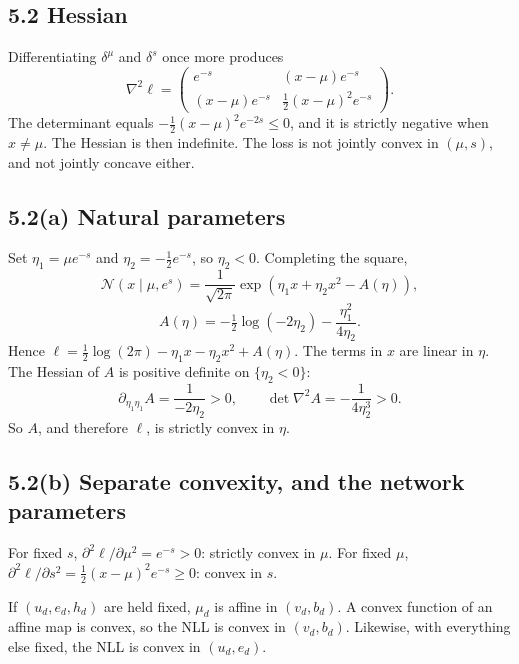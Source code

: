\documentclass[11pt]{article}
\theoremstyle{remark}
\newcommand{\N}{\mathcal{N}}
\begin{document}
\subsection*{5.2 Hessian}

Differentiating \(\delta^\mu\) and \(\delta^s\) once more produces
\[
\nabla^2\ell
=\begin{pmatrix}
e^{-s} & (x-\mu)e^{-s}\\
(x-\mu)e^{-s} & \tfrac12(x-\mu)^2 e^{-s}
\end{pmatrix}.
\]
The determinant equals \(-\tfrac12(x-\mu)^2 e^{-2s}\le 0\), and it is strictly negative when \(x\ne\mu\). The Hessian is then indefinite. The loss is not jointly convex in \((\mu,s)\), and not jointly concave either.

\subsection*{5.2(a) Natural parameters}

Set \(\eta_1=\mu e^{-s}\) and \(\eta_2=-\tfrac12 e^{-s}\), so \(\eta_2<0\). Completing the square,
\[
\N(x\mid\mu,e^s)
=\frac{1}{\sqrt{2\pi}}\exp(\eta_1 x+\eta_2 x^2-A(\eta)),
\]
\[
A(\eta)=-\tfrac12\log(-2\eta_2)-\frac{\eta_1^2}{4\eta_2}.
\]
Hence \(\ell=\tfrac12\log(2\pi)-\eta_1 x-\eta_2 x^2+A(\eta)\). The terms in \(x\) are linear in \(\eta\). The Hessian of \(A\) is positive definite on \(\{\eta_2<0\}\):
\[
\partial_{\eta_1\eta_1}A=\frac{1}{-2\eta_2}>0,\qquad
\det\nabla^2 A=-\frac{1}{4\eta_2^3}>0.
\]
So \(A\), and therefore \(\ell\), is strictly convex in \(\eta\).

\subsection*{5.2(b) Separate convexity, and the network parameters}

For fixed \(s\), \(\partial^2\ell/\partial\mu^2=e^{-s}>0\): strictly convex in \(\mu\). For fixed \(\mu\), \(\partial^2\ell/\partial s^2=\tfrac12(x-\mu)^2 e^{-s}\ge 0\): convex in \(s\).

If \((u_d,e_d,h_d)\) are held fixed, \(\mu_d\) is affine in \((v_d,b_d)\). A convex function of an affine map is convex, so the NLL is convex in \((v_d,b_d)\). Likewise, with everything else fixed, the NLL is convex in \((u_d,e_d)\).
\end{document}
